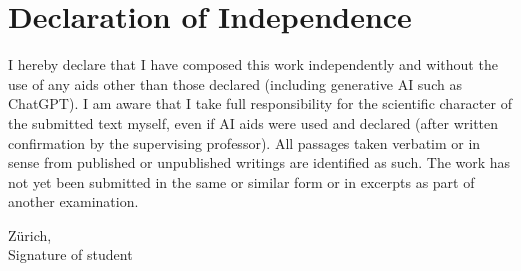 \chapter*{Declaration of Independence}
I hereby declare that I have composed this work independently and without the use of any aids other than those declared (including generative AI such as ChatGPT). I am aware that I take full responsibility for the scientific character of the submitted text myself, even if AI aids were used and declared (after written confirmation by the supervising professor). All passages taken verbatim or in sense from published or unpublished writings are identified as such. The work has not yet been submitted in the same or similar form or in excerpts as part of another examination.

\vspace{2cm}

Z{\"u}rich, \hspace{5cm} \hrulefill \\
\hspace*{6.4cm} Signature of student